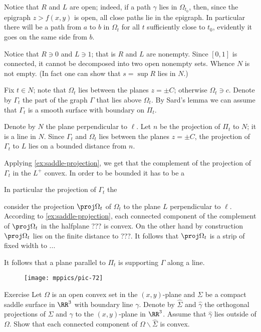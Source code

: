 Notice that $R$ and $L$ are open; indeed, if a path $\gamma$ lies in $\Omega_{t_0}$, then, since the epigraph $z>f(x,y)$ is open, all close paths lie in the epigraph.
In particular there will be a path from $a$ to $b$ in $\Omega_t$ for all $t$ sufficiently close to $t_0$,
evidently it goes on the same side from $b$.

Notice that $R\ni 0$ and $L\ni 1$; that is $R$ and $L$ are nonempty.
Since $[0,1]$ is connected, it cannot be decomposed into two open nonempty sets.
Whence $N$ is not empty.
(In fact one can show that $s=\sup R$ lies in $N$.)


Fix $t\in N$; note that $\Omega_t$ lies between the planes $z=\pm C$;
otherwise $\Omega_t\ni c$.
Denote by $\Gamma_t$ the part of the graph $\Gamma$ that lies above $\Omega_t$.
By Sard's lemma we can assume that $\Gamma_t$ is a smooth surface with boundary on $\Pi_t$.

Denote by $N$ the plane perpendicular to $\ell$.
Let $n$ be the projection of $\Pi_t$ to $N$; 
it is a line in $N$.
Since $\Gamma_t$ and $\Omega_t$ lies between the planes $z=\pm C$, the projection of $\Gamma_t$ to $L$ lies on a bounded distance from $n$.

Applying \ref{ex:saddle-projection}, we get that the complement of the projection of $\Gamma_t$ in the $L^+$ convex. 
In order to be bounded it has to be a 


In particular the projection of $\Gamma_t$ the 

consider the projection $\proj\Omega_t$ of $\Omega_t$ to the plane $L$ perpendicular to $\ell$.
According to \ref{ex:saddle-projection},
each connected component of the complement of $\proj\Omega_t$  in the halfplane ??? is convex.
On the other hand by construction $\proj\Omega_t$ lies on the finite distance to ???.
It follows that $\proj\Omega_t$ is a strip of fixed width to ...

It follows that a plane parallel to $\Pi_t$ is supporting $\Gamma$ along a line.

\qeds

\begin{wrapfigure}{o}{40 mm}
\vskip-0mm
\centering
\texttt{[image: mppics/pic-72]}
\vskip0mm
\end{wrapfigure}

\begin{thm}{Exercise}\label{ex:saddle-projection}
Let $\Omega$ is an open convex set in the $(x,y)$-plane and 
$\Sigma$ be a compact saddle surface in $\RR^3$ with boundary line $\gamma$.
Denote by $\hat \Sigma$ and $\hat\gamma$ the orthogonal projections of $\Sigma$ and $\gamma$ to the $(x,y)$-plane in $\RR^3$.
Assume that $\hat\gamma$ lies outside of $\Omega$.
Show that each connected component of $\Omega\backslash \hat\Sigma$ is convex. 
\end{thm}



